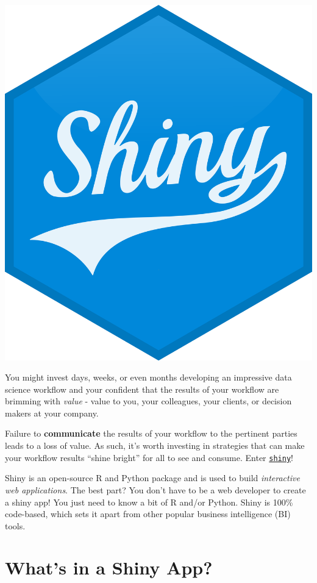 \documentclass[
  letterpaper,
  DIV=11,
  numbers=noendperiod]{scrreprt}
\begin{document}
\begin{center}
\includegraphics{images/shiny.png}
\end{center}

You might invest days, weeks, or even months developing an impressive
data science workflow and your confident that the results of your
workflow are brimming with \emph{value} - value to you, your colleagues,
your clients, or decision makers at your company.

Failure to \textbf{communicate} the results of your workflow to the
pertinent parties leads to a loss of value. As such, it's worth
investing in strategies that can make your workflow results ``shine
bright'' for all to see and consume. Enter
\href{https://shiny.posit.co/}{\texttt{shiny}}!

Shiny is an open-source R and Python package and is used to build
\emph{interactive web applications}. The best part? You don't have to be
a web developer to create a shiny app! You just need to know a bit of R
and/or Python. Shiny is 100\% code-based, which sets it apart from other
popular business intelligence (BI) tools.

\section{What's in a Shiny App?}\label{whats-in-a-shiny-app}
\end{document}
